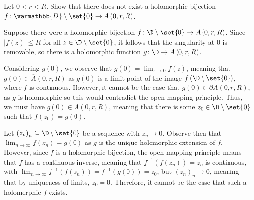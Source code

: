 \documentclass[10pt]{mypackage}
\renewcommand*{\mathbb}[1]{\varmathbb{#1}}
\begin{document}
\begin{problem}[Problem 3]
  Let $0 < r < R$. Show that there does not exist a holomorphic bijection $f\colon \mathbb{D}\setminus \set{0}\rightarrow A\left( 0,r,R \right)$.
\end{problem}
\begin{solution}
  Suppose there were a holomorphic bijection $f\colon \D\setminus \set{0}\rightarrow A\left( 0,r,R \right)$. Since $\left\vert f(z) \right\vert \leq R$ for all $z\in \D\setminus \set{0}$, it follows that the singularity at $0$ is removable, so there is a holomorphic function $g\colon \D\rightarrow A\left( 0,r,R \right)$.\newline

  Considering $g(0)$, we observe that $g(0) = \lim_{z\rightarrow 0}f(z)$, meaning that $g(0)\in \overline{A}\left( 0,r,R \right)$ as $g(0)$ is a limit point of the image $f\left( \D\setminus \set{0} \right)$, where $f$ is continuous. However, it cannot be the case that $g(0)\in \partial A\left( 0,r,R \right)$, as $g$ is holomorphic so this would contradict the open mapping principle. Thus, we must have $g(0)\in A\left( 0,r,R \right)$, meaning that there is some $z_0\in \D\setminus \set{0}$ such that $f\left(z_0\right) = g(0)$.\newline

  Let $\left( z_n \right)_n\subseteq \D\setminus \set{0}$ be a sequence with $z_n\rightarrow 0$. Observe then that $\lim_{n\rightarrow\infty}f\left( z_n \right) = g\left(0\right)$ as $g$ is the unique holomorphic extension of $f$. However, since $f$ is a holomorphic bijection, the open mapping principle means that $f$ has a continuous inverse, meaning that $f^{-1}\left( f\left( z_n \right) \right) = z_n$ is continuous, with $\lim_{n\rightarrow\infty}f^{-1}\left( f\left( z_n \right) \right) = f^{-1}\left( g(0) \right) = z_0$, but $\left( z_n \right)_n\rightarrow 0$, meaning that by uniqueness of limits, $z_0 = 0$. Therefore, it cannot be the case that such a holomorphic $f$ exists.
\end{solution}
\end{document}

